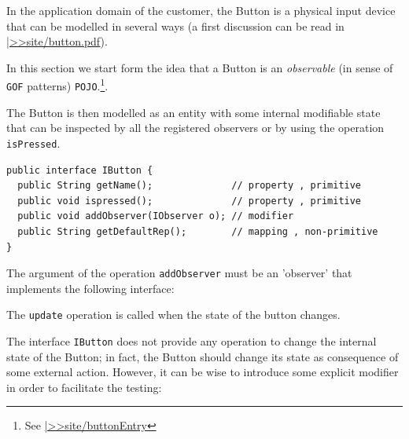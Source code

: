 In the application domain of the customer, the Button is a physical input device that can be modelled in several ways (a first discussion can be read in \href{https://137.204.107.21/syskb/it.unibo.iss2015intro/docs/Appls/ButtonLed/button.pdf}{|>>site/button.pdf}). 

In this section we start form the idea that a Button is an \textit{observable} (in sense of \texttt{GOF} patterns) \texttt{POJO}.\footnote{See \href{https://137.204.107.21/syskb/it.unibo.iss2015intro/docs/Appls/ButtonLed/buttonEntry.html}{|>>site/buttonEntry}}.
 
The Button is then modelled as an entity with some internal modifiable state that can be inspected by all the registered observers or by using the operation \texttt{isPressed}.

\begin{lstlisting}
public interface IButton {
  public String getName();              // property , primitive	
  public void ispressed();              // property , primitive
  public void addObserver(IObserver o); // modifier
  public String getDefaultRep();        // mapping , non-primitive
}
\end{lstlisting}



The argument of the operation \texttt{addObserver} must be an 'observer' that implements the following interface:



The \texttt{update} operation is called when the state of the button changes.

The interface \texttt{IButton} does not provide any operation to change the internal state of the Button; in fact, the Button should change its state as consequence of some external action. However, it can be wise to introduce some explicit modifier in order to facilitate the testing:

